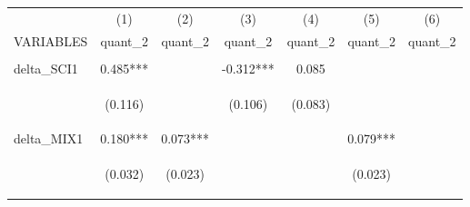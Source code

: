 \begin{center}
\begin{tabular}{lcccccc} \hline
 & (1) & (2) & (3) & (4) & (5) & (6) \\
VARIABLES & quant\_2 & quant\_2 & quant\_2 & quant\_2 & quant\_2 & quant\_2 \\ \hline
\vspace{4pt} & \begin{footnotesize}\end{footnotesize} & \begin{footnotesize}\end{footnotesize} & \begin{footnotesize}\end{footnotesize} & \begin{footnotesize}\end{footnotesize} & \begin{footnotesize}\end{footnotesize} & \begin{footnotesize}\end{footnotesize} \\
delta\_SCI1 & 0.485*** &  & -0.312*** & 0.085 &  &  \\
\vspace{4pt} & \begin{footnotesize}(0.116)\end{footnotesize} & \begin{footnotesize}\end{footnotesize} & \begin{footnotesize}(0.106)\end{footnotesize} & \begin{footnotesize}(0.083)\end{footnotesize} & \begin{footnotesize}\end{footnotesize} & \begin{footnotesize}\end{footnotesize} \\
delta\_MIX1 & 0.180*** & 0.073*** &  &  & 0.079*** &  \\
\vspace{4pt} & \begin{footnotesize}(0.032)\end{footnotesize} & \begin{footnotesize}(0.023)\end{footnotesize} & \begin{footnotesize}\end{footnotesize} & \begin{footnotesize}\end{footnotesize} & \begin{footnotesize}(0.023)\end{footnotesize} & \begin{footnotesize}\end{footnotesize} \\

\end{tabular}
\end{center}
